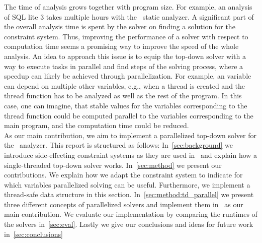 The time of analysis grows together with program size. For example, an analysis of SQL lite 3 takes multiple hours with the \gob\ static analyzer. A significant part of the overall analysis time is spent by the solver on finding a solution for the constraint system. Thus, improving the performance of a solver with respect to computation time seems a promising way to improve the speed of the whole analysis. An idea to approach this issue is to equip the top-down solver with a way to execute tasks in parallel and find steps of the solving process, where a speedup can likely be achieved through parallelization. For example, an variable can depend on multiple other variables, e.g., when a thread is created and the thread function has to be analyzed as well as the rest of the program. In this case, one can imagine, that stable values for the variables corresponding to the thread function could be computed parallel to the variables corresponding to the main program, and the computation time could be reduced.\\
As our main contribution, we aim to implement a parallelized top-down solver for the \gob\ analyzer.
This report is structured as follows: In~\autoref{sec:background} we introduce side-effecting constraint systems as they are used in \gob\ and explain how a single-threaded top-down solver works. In~\autoref{sec:method} we present our contributions. We explain how we adapt the constraint system to indicate for which variables parallelized solving can be useful. Furthermore, we implement a thread-safe data structure in this section. In~\autoref{sec:method:td_parallel} we present three different concepts of parallelized solvers and implement them in \gob\ as our main contribution. We evaluate our implementation by comparing the runtimes of the solvers in~\autoref{sec:eval}. Lastly we give our conclusions and ideas for future work in~\autoref{sec:conclusions} 
